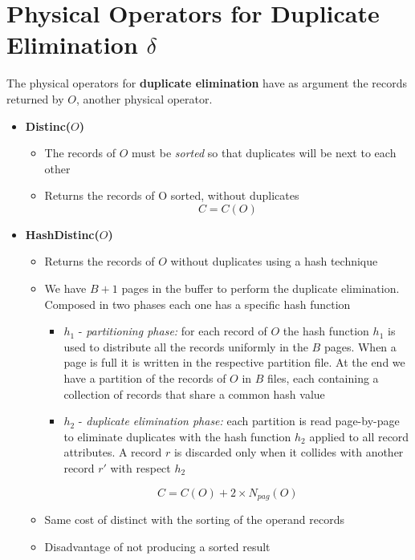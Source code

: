 \section{Physical Operators for Duplicate Elimination $\delta$}
The  physical operators for \textbf{duplicate elimination} have as argument the records returned by $O$, another physical operator.
\begin{itemize}
    \item \textbf{Distinc($O$)}
    \begin{itemize}
        \item The records of $O$ must be \textit{sorted} so that duplicates will be next to each other
        \item Returns the records of O sorted, without duplicates
        $$C = C(O)$$
    \end{itemize}
    \item \textbf{HashDistinc($O$)}
    \begin{itemize}
        \item Returns the records of $O$ without duplicates using a hash technique
        \item We have $B + 1$ pages in the buffer to perform the duplicate elimination. Composed in two phases each one has a specific hash function
        \begin{itemize}
            \item $h_1$ - \textit{partitioning phase:} for each record of $O$ the hash function $h_1$ is used to distribute all the records uniformly in the $B$ pages. When a page is full it is written in the respective partition file. At the end we have a partition of the records of $O$ in $B$ files, each containing a collection of records that share a common hash value
            \item $h_2$ - \textit{duplicate elimination phase:} each partition is read page-by-page to eliminate duplicates with the hash function $h_2$ applied to all record attributes. A record $r$ is discarded only when it collides with another record $r'$ with respect $h_2$
        \end{itemize}
        $$C = C(O) + 2 \times N_{pag}(O)$$
        \item Same cost of distinct with the sorting of the operand records
        \item Disadvantage of not producing a sorted result
    \end{itemize}
\end{itemize}

